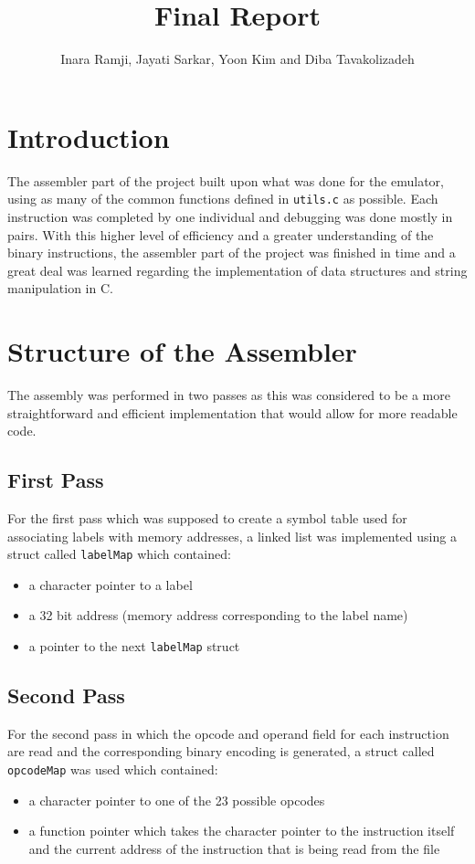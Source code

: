 \documentclass[11pt]{article}
\title{Final Report}
\author{Inara Ramji, Jayati Sarkar, Yoon Kim and Diba Tavakolizadeh}
\begin{document}
\maketitle

\section{Introduction}

The assembler part of the project built upon what was done for the emulator, using as many of the common functions defined in \texttt{utils.c} as possible. Each instruction was completed by one individual and debugging was done mostly in pairs. With this higher level of efficiency and a greater understanding of the binary instructions, the assembler part of the project was finished in time and a great deal was learned regarding the implementation of data structures and string manipulation in C.

\section{Structure of the Assembler}

The assembly was performed in two passes as this was considered to be a more straightforward and efficient implementation that would allow for more readable code.

\subsection{First Pass}

For the first pass which was supposed to create a symbol table used for associating labels with memory addresses, a linked list was implemented using a struct called \texttt{labelMap} which contained:
\begin{itemize}
\item a character pointer to a label
\item a 32 bit address (memory address corresponding to the label name)
\item a pointer to the next \texttt{labelMap} struct
\end{itemize}

\subsection{Second Pass}

For the second pass in which the opcode and operand field for each instruction are read and the corresponding binary encoding is generated, a struct called \texttt{opcodeMap} was used which contained:
\begin{itemize}
\item a character pointer to one of the 23 possible opcodes
\item a function pointer which takes the character pointer to the instruction itself and the current address of the instruction that is being read from the file
\end{itemize}
\end{document}
